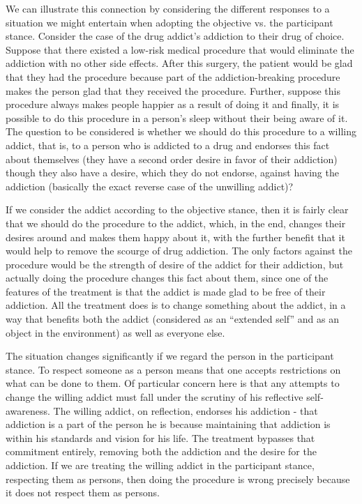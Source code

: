 \documentclass[phd,12pt,oneside,paper=letterpaper]{ubcthesis}
\begin{document}
We can illustrate this connection by considering the different responses to a situation we might entertain when adopting the objective vs. the participant stance. Consider the case of the drug addict's addiction to their drug of choice. Suppose that there existed a low-risk medical procedure that would eliminate the addiction with no other side effects. After this surgery, the patient would be glad that they had the procedure because part of the addiction-breaking procedure makes the person glad that they received the procedure. Further, suppose this procedure always makes people happier as a result of doing it and finally, it is possible to do this procedure in a person's sleep without their being aware of it. The question to be considered is whether we should do this procedure to a willing addict, that is, to a person who is addicted to a drug and endorses this fact about themselves (they have a second order desire in favor of their addiction) though they also have a desire, which they do not endorse, against having the addiction (basically the exact reverse case of the unwilling addict)? 

If we consider the addict according to the objective stance, then it is fairly clear that we should do the procedure to the addict, which, in the end, changes their desires around and makes them happy about it, with the further benefit that it would help to remove the scourge of drug addiction. The only factors against the procedure would be the strength of desire of the addict for their addiction, but actually doing the procedure changes this fact about them, since one of the features of the treatment is that the addict is made glad to be free of their addiction. All the treatment does is to change something about the addict, in a way that benefits both the addict (considered as an ``extended self'' and as an object in the environment) as well as everyone else. 

The situation changes significantly if we regard the person in the participant stance. To respect someone as a person means that one accepts restrictions on what can be done to them. Of particular concern here is that any attempts to change the willing addict must fall under the scrutiny of his reflective self-awareness. The willing addict, on reflection, endorses his addiction - that addiction is a part of the person he is because maintaining that addiction is within his standards and vision for his life. The treatment bypasses that commitment entirely, removing both the addiction and the desire for the addiction. If we are treating the willing addict in the participant stance, respecting them as persons, then doing the procedure is wrong precisely because it does not respect them as persons. 
\end{document}
